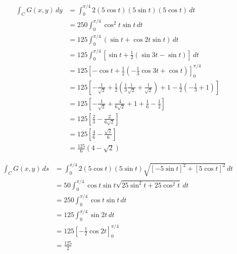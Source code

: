 \documentclass{article}
\begin{document}
\begin{align*}
  \int_C G(x, y) \,dy & = \int_0^{\pi / 4} 2 (5 \cos t) (5 \sin t) (5 \cos t) \,dt                                                                                                                  \\
                      & = 250 \int_0^{\pi / 4} \cos^2 t \sin t \,dt                                                                                                                                 \\
                      & = 125 \int_0^{\pi / 4} (\sin t + \cos 2 t \sin t) \,dt                                                                                                                      \\
                      & = 125 \int_0^{\pi / 4} \left[ \sin t + \frac{1}{2} (\sin 3 t - \sin t) \right] \,dt                                                                                         \\
                      & = 125 \left[ -\cos t + \frac{1}{2} \left( -\frac{1}{3} \cos 3 t + \cos t \right) \right]_0^{\pi / 4}                                                                        \\
                      & = 125 \left[ -\frac{1}{\sqrt{2}} + \frac{1}{2} \left( \frac{1}{3} \frac{1}{\sqrt{2}} + \frac{1}{\sqrt{2}} \right) + 1 - \frac{1}{2} \left( -\frac{1}{3} + 1 \right) \right] \\
                      & = 125 \left[ -\frac{1}{\sqrt{2}} + \frac{4}{6 \sqrt{2}} + 1 + \frac{1}{6} - \frac{1}{2} \right]                                                                             \\
                      & = 125 \left[ \frac{2}{3} - \frac{2}{6 \sqrt{2}} \right]                                                                                                                     \\
                      & = 125 \left[ \frac{4}{6} - \frac{\sqrt{2}}{6} \right]                                                                                                                       \\
                      & = \frac{125}{6} (4 - \sqrt{2})
\end{align*}

\begin{align*}
  \int_C G(x, y) \,ds & = \int_0^{\pi / 4} 2 (5 \cos t) (5 \sin t) \sqrt{[-5 \sin t]^2 + [5 \cos t]^2} \,dt \\
                      & = 50 \int_0^{\pi / 4} \cos t \sin t \sqrt{25 \sin^2 t + 25 \cos^2 t} \,dt           \\
                      & = 250 \int_0^{\pi / 4} \cos t \sin t \,dt                                           \\
                      & = 125 \int_0^{\pi / 4} \sin 2 t \,dt                                                \\
                      & = 125 \left[ -\frac{1}{2} \cos 2 t \right]_0^{\pi / 4}                              \\
                      & = \frac{125}{2}
\end{align*}
\end{document}
